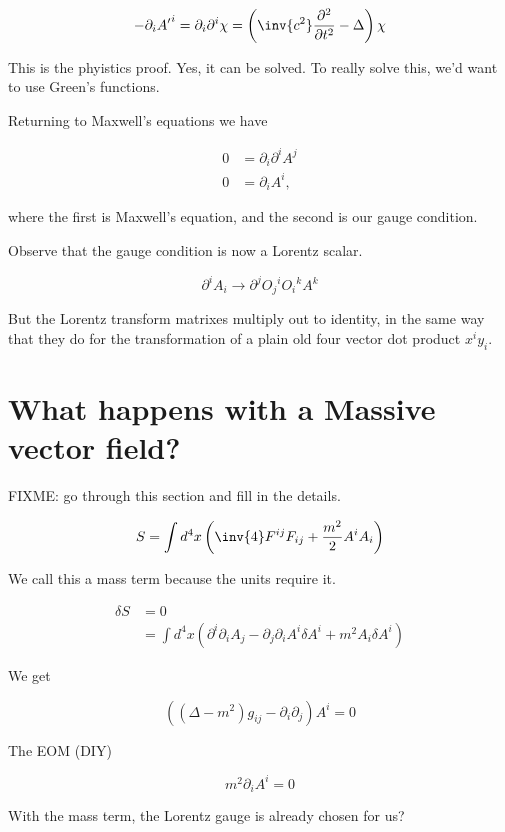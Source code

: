 \begin{equation}\label{eqn:relativisticElectrodynamicsL14:510}
-\partial_i {A'}^i = \partial_i \partial^i \chi = \left( \inv{c^2} \frac{\partial^2}{\partial t^2} - \Delta \right) \chi
\end{equation}

This is the phyistics proof.  Yes, it can be solved.  To really solve this, we'd want to use Green's functions.

Returning to Maxwell's equations we have

\begin{align}\label{eqn:relativisticElectrodynamicsL14:530}
0 &= \partial_i \partial^i A^j \\
0 &= \partial_i A^i ,
\end{align}

where the first is Maxwell's equation, and the second is our gauge condition.

Observe that the gauge condition is now a Lorentz scalar.

\begin{equation}\label{eqn:relativisticElectrodynamicsL14:550}
\partial^i A_i \rightarrow \partial^j {O_j}^i {O_i}^k A^k
\end{equation}

But the Lorentz transform matrixes multiply out to identity, in the same way that they do for the transformation of a plain old four vector dot product $x^i y_i$.

\section{What happens with a Massive vector field?}

FIXME: go through this section and fill in the details.

\begin{equation}\label{eqn:relativisticElectrodynamicsL14:570}
S = \int d^4 x \left( \inv{4} F^{ij} F_{ij} + \frac{m^2}{2} A^i A_i \right)
\end{equation}

We call this a mass term because the units require it.

\begin{align*}
\delta S 
&= 0  \\
&= \int d^4 x \left( \partial^i \partial_i A_j - \partial_j \partial_i A^i \delta A^i + m^2 A_i \delta A^i \right)
\end{align*}

We get 

\begin{equation}\label{eqn:relativisticElectrodynamicsL14:590}
\left( (\Delta - m^2) g_{ij} - \partial_i \partial_j \right) A^i = 0
\end{equation}

The EOM (DIY)

\begin{equation}\label{eqn:relativisticElectrodynamicsL14:610}
m^2 \partial_i A^i = 0
\end{equation}

With the mass term, the Lorentz gauge is already chosen for us?

\EndArticle
